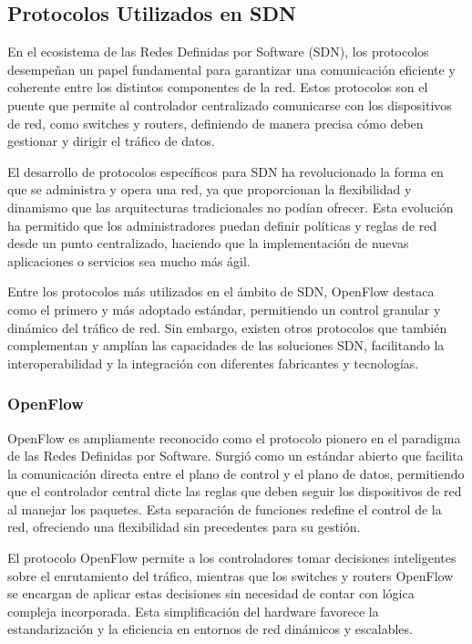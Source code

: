 {        \subsection{Protocolos Utilizados en SDN}
            En el ecosistema de las Redes Definidas por Software (SDN), los protocolos desempeñan un papel fundamental para garantizar una comunicación eficiente y coherente entre los distintos componentes de la red. Estos protocolos son el puente que permite al controlador centralizado comunicarse con los dispositivos de red, como switches y routers, definiendo de manera precisa cómo deben gestionar y dirigir el tráfico de datos.
            
            El desarrollo de protocolos específicos para SDN ha revolucionado la forma en que se administra y opera una red, ya que proporcionan la flexibilidad y dinamismo que las arquitecturas tradicionales no podían ofrecer. Esta evolución ha permitido que los administradores puedan definir políticas y reglas de red desde un punto centralizado, haciendo que la implementación de nuevas aplicaciones o servicios sea mucho más ágil.
            
            Entre los protocolos más utilizados en el ámbito de SDN, OpenFlow destaca como el primero y más adoptado estándar, permitiendo un control granular y dinámico del tráfico de red. Sin embargo, existen otros protocolos que también complementan y amplían las capacidades de las soluciones SDN, facilitando la interoperabilidad y la integración con diferentes fabricantes y tecnologías.
            
            \subsubsection{OpenFlow}
                OpenFlow es ampliamente reconocido como el protocolo pionero en el paradigma de las Redes Definidas por Software. Surgió como un estándar abierto que facilita la comunicación directa entre el plano de control y el plano de datos, permitiendo que el controlador central dicte las reglas que deben seguir los dispositivos de red al manejar los paquetes. Esta separación de funciones redefine el control de la red, ofreciendo una flexibilidad sin precedentes para su gestión.
                
                El protocolo OpenFlow permite a los controladores tomar decisiones inteligentes sobre el enrutamiento del tráfico, mientras que los switches y routers OpenFlow se encargan de aplicar estas decisiones sin necesidad de contar con lógica compleja incorporada. Esta simplificación del hardware favorece la estandarización y la eficiencia en entornos de red dinámicos y escalables.
                
}
